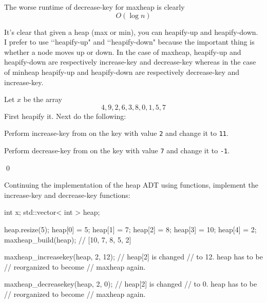 The worse runtime of decrease-key for maxheap is clearly
\[
O(\log n)
\]

It's clear that given a heap (max or min), 
you can heapify-up and heapify-down.
I prefer to use 
\lq\lq heapify-up"
and 
\lq\lq heapify-down"
because the important thing is whether a node moves up or down.
In the case of maxheap, 
heapify-up and heapify-down
are respectively
increase-key and decrease-key
whereas
in the case of minheap
heapify-up and heapify-down
are respectively
decrease-key and increase-key.




\newpage
\begin{ex}
Let $x$ be the array
\[
4, 9, 2, 6, 3, 8, 0, 1, 5, 7
\]
First heapify it.
Next do the following:
\begin{tightlist}
  \item Perform increase-key from on the key with value \texttt{2}
  and change it to \texttt{11}.
  \item Perform decrease-key from on the key with value
  \texttt{7} and change it to \texttt{-1}.
\end{tightlist}
\qed
\end{ex}



\newpage
\begin{ex}
Continuing the implementation of the heap ADT using functions,
implement the increase-key and decrease-key
functions:
\begin{console}
int x;
std::vector< int > heap;

heap.resize(5);
heap[0] = 5;
heap[1] = 7;
heap[2] = 8;
heap[3] = 10;
heap[4] = 2;
maxheap_build(heap);      // [10, 7, 8, 5, 2]

maxheap_increasekey(heap, 2, 12); // heap[2] is changed
                          // to 12. heap has to be
                          // reorganized to become
                          // maxheap again.
                          
maxheap_decreasekey(heap, 2, 0); // heap[2] is changed
                          // to 0. heap has to be
                          // reorganized to become
                          // maxheap again.
\end{console}
\end{ex}
